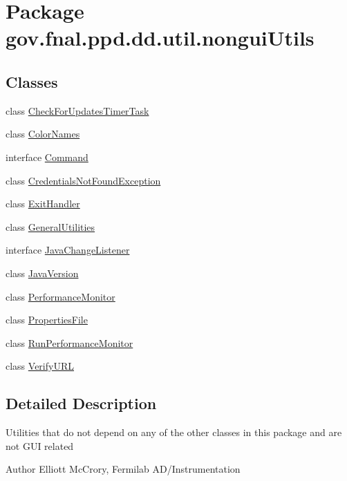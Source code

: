 \hypertarget{namespacegov_1_1fnal_1_1ppd_1_1dd_1_1util_1_1nonguiUtils}{\section{Package gov.\-fnal.\-ppd.\-dd.\-util.\-nongui\-Utils}
\label{namespacegov_1_1fnal_1_1ppd_1_1dd_1_1util_1_1nonguiUtils}
}
\subsection*{Classes}
\begin{DoxyCompactItemize}
\item 
class \hyperlink{classgov_1_1fnal_1_1ppd_1_1dd_1_1util_1_1nonguiUtils_1_1CheckForUpdatesTimerTask}{Check\-For\-Updates\-Timer\-Task}
\item 
class \hyperlink{classgov_1_1fnal_1_1ppd_1_1dd_1_1util_1_1nonguiUtils_1_1ColorNames}{Color\-Names}
\item 
interface \hyperlink{interfacegov_1_1fnal_1_1ppd_1_1dd_1_1util_1_1nonguiUtils_1_1Command}{Command}
\item 
class \hyperlink{classgov_1_1fnal_1_1ppd_1_1dd_1_1util_1_1nonguiUtils_1_1CredentialsNotFoundException}{Credentials\-Not\-Found\-Exception}
\item 
class \hyperlink{classgov_1_1fnal_1_1ppd_1_1dd_1_1util_1_1nonguiUtils_1_1ExitHandler}{Exit\-Handler}
\item 
class \hyperlink{classgov_1_1fnal_1_1ppd_1_1dd_1_1util_1_1nonguiUtils_1_1GeneralUtilities}{General\-Utilities}
\item 
interface \hyperlink{interfacegov_1_1fnal_1_1ppd_1_1dd_1_1util_1_1nonguiUtils_1_1JavaChangeListener}{Java\-Change\-Listener}
\item 
class \hyperlink{classgov_1_1fnal_1_1ppd_1_1dd_1_1util_1_1nonguiUtils_1_1JavaVersion}{Java\-Version}
\item 
class \hyperlink{classgov_1_1fnal_1_1ppd_1_1dd_1_1util_1_1nonguiUtils_1_1PerformanceMonitor}{Performance\-Monitor}
\item 
class \hyperlink{classgov_1_1fnal_1_1ppd_1_1dd_1_1util_1_1nonguiUtils_1_1PropertiesFile}{Properties\-File}
\item 
class \hyperlink{classgov_1_1fnal_1_1ppd_1_1dd_1_1util_1_1nonguiUtils_1_1RunPerformanceMonitor}{Run\-Performance\-Monitor}
\item 
class \hyperlink{classgov_1_1fnal_1_1ppd_1_1dd_1_1util_1_1nonguiUtils_1_1VerifyURL}{Verify\-U\-R\-L}
\end{DoxyCompactItemize}


\subsection{Detailed Description}
Utilities that do not depend on any of the other classes in this package and are not G\-U\-I related

\begin{DoxyAuthor}{Author}
Elliott Mc\-Crory, Fermilab A\-D/\-Instrumentation 
\end{DoxyAuthor}
